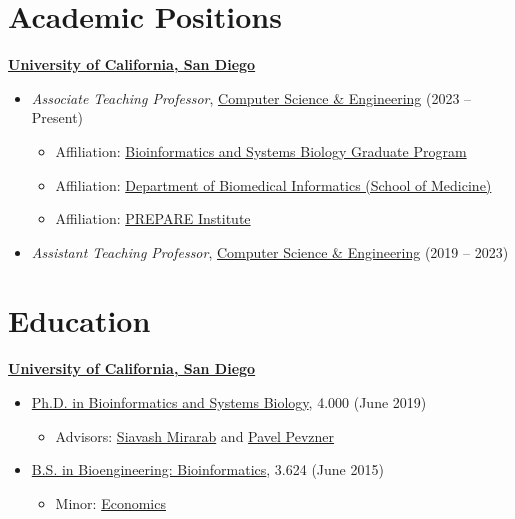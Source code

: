 \documentclass[margin,line]{res}
\begin{document}
\begin{resume}

\section{\sc Academic Positions}
{\bf \href{http://www.ucsd.edu/}{University of California, San Diego}}\\
\vspace*{-.1in}
\begin{itemize}
\item[] \hspace*{-2mm} \textit{Associate Teaching Professor}, \href{http://www.cs.ucsd.edu/}{Computer Science \& Engineering} (2023 -- Present)
\begin{itemize}
\item Affiliation: \href{http://bioinformatics.ucsd.edu/}{Bioinformatics and Systems Biology Graduate Program}
\item Affiliation: \href{http://dbmi.ucsd.edu/}{Department of Biomedical Informatics (School of Medicine)}
\item Affiliation: \href{https://prepare.ucsd.edu/}{PREPARE Institute}
\end{itemize}
\item[] \hspace*{-2mm} \textit{Assistant Teaching Professor}, \href{http://www.cs.ucsd.edu/}{Computer Science \& Engineering} (2019 -- 2023)
\end{itemize}

\section{\sc Education}
{\bf \href{http://www.ucsd.edu/}{University of California, San Diego}}\\
\vspace*{-.1in}
\begin{itemize}
\item[] \hspace*{-2mm}\href{http://bioinformatics.ucsd.edu/}{Ph.D. in Bioinformatics and Systems Biology}, 4.000 (June 2019)
\begin{itemize}
\item Advisors: \href{http://eceweb.ucsd.edu/~smirarab/}{Siavash Mirarab} and \href{http://cseweb.ucsd.edu/~ppevzner/}{Pavel Pevzner}
\end{itemize}
\vspace*{0in}
\item[] \hspace*{-2mm}\href{http://be.ucsd.edu/bioinformatics}{B.S. in Bioengineering: Bioinformatics}, 3.624 (June 2015)
\begin{itemize}
\item Minor: \href{https://economics.ucsd.edu/undergraduate-program/major-minor-requirements/minors.html}{Economics}
\end{itemize}
\end{itemize}


\end{resume}
\end{document}
